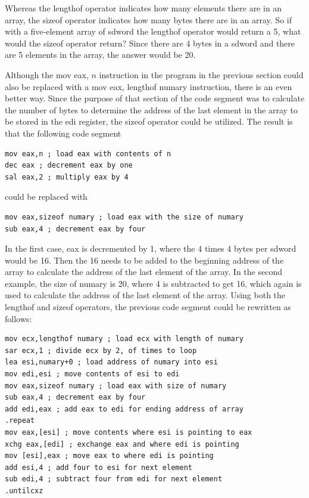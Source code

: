\documentclass[10pt]{book}
\begin{document}
Whereas the lengthof operator indicates how many elements there are in an array, the sizeof operator indicates how many bytes there are in an array. So if with a five-element array of sdword the lengthof operator would return a 5, what would the sizeof operator return? Since there are 4 bytes in a sdword and there are 5 elements in the array, the answer would be 20.

Although the mov eax, $n$ instruction in the program in the previous section could also be replaced with a mov eax, lengthof numary instruction, there is an even better way. Since the purpose of that section of the code segment was to calculate the number of bytes to determine the address of the last element in the array to be stored in the edi register, the sizeof operator could be utilized. The result is that the following code segment

\begin{verbatim}
mov eax,n ; load eax with contents of n
dec eax ; decrement eax by one
sal eax,2 ; multiply eax by 4
\end{verbatim}

could be replaced with

\begin{verbatim}
mov eax,sizeof numary ; load eax with the size of numary
sub eax,4 ; decrement eax by four
\end{verbatim}

In the first case, eax is decremented by 1, where the 4 times 4 bytes per sdword would be 16. Then the 16 needs to be added to the beginning address of the array to calculate the address of the last element of the array. In the second example, the size of numary is 20, where 4 is subtracted to get 16, which again is used to calculate the address of the last element of the array. Using both the lengthof and sizeof operators, the previous code segment could be rewritten as follows:
\begin{verbatim}
mov ecx,lengthof numary ; load ecx with length of numary
sar ecx,1 ; divide ecx by 2, of times to loop
lea esi,numary+0 ; load address of numary into esi
mov edi,esi ; move contents of esi to edi
mov eax,sizeof numary ; load eax with size of numary
sub eax,4 ; decrement eax by four
add edi,eax ; add eax to edi for ending address of array
.repeat
mov eax,[esi] ; move contents where esi is pointing to eax
xchg eax,[edi] ; exchange eax and where edi is pointing
mov [esi],eax ; move eax to where edi is pointing
add esi,4 ; add four to esi for next element
sub edi,4 ; subtract four from edi for next element
.untilcxz
\end{verbatim}
\end{document}
